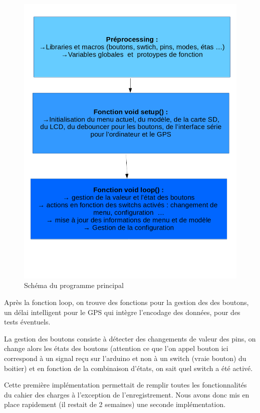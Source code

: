 \documentclass{report}
\begin{document}
\begin{figure}[H]
	\begin{center}
		\includegraphics[scale=0.5]{schemaProgramme.png}
	\end{center}
	\caption{Schéma du programme principal}
\end{figure}

Après la fonction loop, on trouve des fonctions pour la gestion des
des boutons, un délai intelligent pour le GPS qui intègre l'encodage
des données, pour des tests éventuels.

La gestion des boutons consiste à détecter des changements de valeur
des pins, on change alors les états des boutons (attention ce que l'on
appel bouton ici correspond à un signal reçu sur l'arduino et non
à un switch (vraie bouton) du boitier) et en fonction
de la combinaison d'états, on sait quel switch a été activé.

Cette première implémentation permettait de remplir toutes les
fonctionnalités du cahier des charges à l'exception de l'enregistrement.
Nous avons donc mis en place rapidement (il restait de 2 semaines)
une seconde implémentation.
\end{document}
